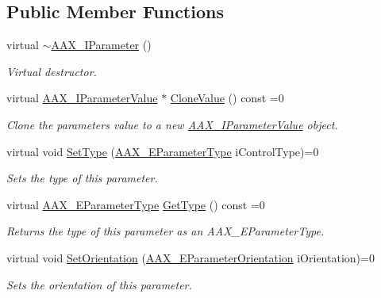 \subsection*{Public Member Functions}
\begin{DoxyCompactItemize}
\item 
virtual \mbox{\hyperlink{a01857_a69062a223819c3467ea308c816b28c6b}{$\sim$\+A\+A\+X\+\_\+\+I\+Parameter}} ()
\begin{DoxyCompactList}\small\item\em Virtual destructor. \end{DoxyCompactList}\item 
virtual \mbox{\hyperlink{a01853}{A\+A\+X\+\_\+\+I\+Parameter\+Value}} $\ast$ \mbox{\hyperlink{a01857_a85ce34797e0a9bb3cf05458757144cb9}{Clone\+Value}} () const =0
\begin{DoxyCompactList}\small\item\em Clone the parameter\textquotesingle{}s value to a new \mbox{\hyperlink{a01853}{A\+A\+X\+\_\+\+I\+Parameter\+Value}} object. \end{DoxyCompactList}\item 
virtual void \mbox{\hyperlink{a01857_ac03b38e048e92dd2ec086f9041b52c54}{Set\+Type}} (\mbox{\hyperlink{a00491_a4cd0f189daa9a60cf36883c56344bb2e}{A\+A\+X\+\_\+\+E\+Parameter\+Type}} i\+Control\+Type)=0
\begin{DoxyCompactList}\small\item\em Sets the type of this parameter. \end{DoxyCompactList}\item 
virtual \mbox{\hyperlink{a00491_a4cd0f189daa9a60cf36883c56344bb2e}{A\+A\+X\+\_\+\+E\+Parameter\+Type}} \mbox{\hyperlink{a01857_a0c096b4092b2146d9aa0413bceeaac48}{Get\+Type}} () const =0
\begin{DoxyCompactList}\small\item\em Returns the type of this parameter as an A\+A\+X\+\_\+\+E\+Parameter\+Type. \end{DoxyCompactList}\item 
virtual void \mbox{\hyperlink{a01857_ac8ba9ed15da3c235ef9844177e1cf6d0}{Set\+Orientation}} (\mbox{\hyperlink{a00491_a52f91d1c14aa5dceedabfb9d2de31bf0}{A\+A\+X\+\_\+\+E\+Parameter\+Orientation}} i\+Orientation)=0
\begin{DoxyCompactList}\small\item\em Sets the orientation of this parameter. \end{DoxyCompactList}\item 

\end{DoxyCompactItemize}
